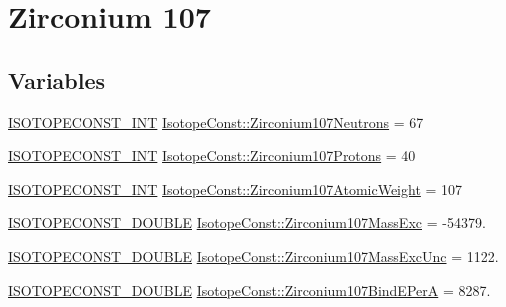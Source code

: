 \hypertarget{group___isotope_const-_zirconium-_zr107}{}\section{Zirconium 107}
\label{group___isotope_const-_zirconium-_zr107}
\subsection*{Variables}
\begin{DoxyCompactItemize}
\item 
\mbox{\hyperlink{group___isotope_const-_macros_ga5f18360b3e99483a35c32d789e62621c}{I\+S\+O\+T\+O\+P\+E\+C\+O\+N\+S\+T\+\_\+\+I\+NT}} \mbox{\hyperlink{group___isotope_const-_zirconium-_zr107_ga930111f819fe5698640f342032a54900}{Isotope\+Const\+::\+Zirconium107\+Neutrons}} = 67
\item 
\mbox{\hyperlink{group___isotope_const-_macros_ga5f18360b3e99483a35c32d789e62621c}{I\+S\+O\+T\+O\+P\+E\+C\+O\+N\+S\+T\+\_\+\+I\+NT}} \mbox{\hyperlink{group___isotope_const-_zirconium-_zr107_ga5a65ac01e34ad0229af992901fc19bed}{Isotope\+Const\+::\+Zirconium107\+Protons}} = 40
\item 
\mbox{\hyperlink{group___isotope_const-_macros_ga5f18360b3e99483a35c32d789e62621c}{I\+S\+O\+T\+O\+P\+E\+C\+O\+N\+S\+T\+\_\+\+I\+NT}} \mbox{\hyperlink{group___isotope_const-_zirconium-_zr107_gae5788e430400954084590ad706ce78c2}{Isotope\+Const\+::\+Zirconium107\+Atomic\+Weight}} = 107
\item 
\mbox{\hyperlink{group___isotope_const-_macros_ga8f45a7272ce02c0b4c65c44636ed719a}{I\+S\+O\+T\+O\+P\+E\+C\+O\+N\+S\+T\+\_\+\+D\+O\+U\+B\+LE}} \mbox{\hyperlink{group___isotope_const-_zirconium-_zr107_ga430d184c0e105888bea04c18df287d3b}{Isotope\+Const\+::\+Zirconium107\+Mass\+Exc}} = -\/54379.
\item 
\mbox{\hyperlink{group___isotope_const-_macros_ga8f45a7272ce02c0b4c65c44636ed719a}{I\+S\+O\+T\+O\+P\+E\+C\+O\+N\+S\+T\+\_\+\+D\+O\+U\+B\+LE}} \mbox{\hyperlink{group___isotope_const-_zirconium-_zr107_gacee5e059b20b4dbe1b10d0ade1b90ac8}{Isotope\+Const\+::\+Zirconium107\+Mass\+Exc\+Unc}} = 1122.
\item 
\mbox{\hyperlink{group___isotope_const-_macros_ga8f45a7272ce02c0b4c65c44636ed719a}{I\+S\+O\+T\+O\+P\+E\+C\+O\+N\+S\+T\+\_\+\+D\+O\+U\+B\+LE}} \mbox{\hyperlink{group___isotope_const-_zirconium-_zr107_ga71a3a1f27a1b3b40a9d2346d5dbd3e6d}{Isotope\+Const\+::\+Zirconium107\+Bind\+E\+PerA}} = 8287.
\item 

\end{DoxyCompactItemize}
